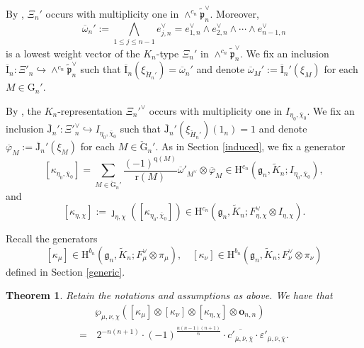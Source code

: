 \documentclass[12pt, a4paper]{amsart}
\newcommand{\RG}{{\mathrm {G}}}
\newcommand{\RH}{{\mathrm {H}}}
\newcommand{\RI}{{\mathrm {I}}}
\newcommand{\RJ}{{\mathrm {J}}}
\theoremstyle{Theorem}
\theoremstyle{Theorem}
\theoremstyle{Theorem}
\theoremstyle{Theorem}
\newtheorem{thmp}[prp]{Theorem}
\theoremstyle{Plain}
\theoremstyle{Definition}
\begin{document}
	
	
	By \cite[Lemma 4.3]{DX}, $\Xi_n'$ occurs with multiplicity one in $\wedge^{c_n}\widetilde{\mathfrak{p}}_n^{\vee}$. Moreover,
	\[
	\overline{\omega}_n':=\bigwedge_{1\leq j\leq n-1}e_{j,n}^{\vee}=e_{1,n}^{\vee}\wedge e_{2,n}^{\vee}\wedge\cdots\wedge e_{n-1,n}^{\vee}
	\]
	is a lowest weight vector of the $K_n$-type $\Xi_n'$ in $\wedge^{c_n}\widetilde{\mathfrak{p}}_n^{\vee}$. We fix an inclusion $\overline{\RI}_n:\Xi'_n\hookrightarrow\wedge^{c_n}\widetilde{\mathfrak{p}}_n^{\vee}$ such that $\overline{\RI}_n(\xi_{\check{H}_n'})=\overline{\omega}_n'$ and denote $\overline{\omega}_M':=\overline{\RI}_n'(\xi_M)$ for each $M\in\RG_n'$.
	
	By \cite[Lemma 4.1]{DX}, the $K_n$-representation $\Xi_n'^{\vee}$ occurs with multiplicity one in $I_{\eta_0,\overline{\chi}_0}$. We fix an inclusion $\overline{\RJ}_n':\Xi'^{\vee}_n\hookrightarrow I_{\eta_0,\overline{\chi}_0}$ such that $\overline{\RJ}_n'(\xi_{\check{H}_n'})(1_n)=1$ and denote $\overline{\varphi}_M:=\overline{\RJ}_n'(\xi_M)$ for each $M\in\check{\RG}_n'$. As in Section \ref{induced}, we fix a generator
	\[
	[\kappa_{\eta_0,\overline{\chi}_0}]=\sum_{M\in\check{\RG}_n'}\frac{(-1)^{\mathrm{q}(M)}}{\mathrm{r}(M)}\overline{\omega}'_{M^{\vee}}\otimes\overline{\varphi}_M\in\RH^{c_n}\left(\mathfrak{g}_n,\widetilde{K}_n;I_{\eta_0,\overline{\chi}_0}\right),
	\]
	and
	\[
	[\kappa_{\eta,\chi}]:=\jmath_{\eta,\chi}([\kappa_{\eta_0,\overline{\chi}_0}])\in\RH^{c_n}\left(\mathfrak{g}_n,\widetilde{K}_n;F_{\eta,\chi}^{\vee}\otimes I_{\eta,\chi}\right).
	\]
	
	Recall the generators 
	\[
	[\kappa_{\mu}]\in\RH^{b_{n}}\left(\mathfrak{g}_{n},\widetilde{K}_{n};F_{\mu}^{\vee}\otimes\pi_{\mu}\right),\quad
	[\kappa_{\nu}]\in\RH^{b_{n}}\left(\mathfrak{g}_{n},\widetilde{K}_{n};F_{\nu}^{\vee}\otimes\pi_{\nu}\right)
	\]
	defined in Section \ref{generic}.
	
	
	
	
	\begin{thmp}
		Retain the notations and assumptions as above. We have that
		\[
		\begin{aligned}
			&\wp_{\mu,\nu,\chi}\left([\kappa_{\mu}]\otimes[\kappa_{\nu}]\otimes[\kappa_{\eta,\chi}]\otimes\mathbf{o}_{n,n}\right)\\
			=&\,2^{-n(n+1)}\cdot (-1)^{\frac{n(n-1)(n+1)}{6}}\cdot  \overline{c'_{\overline{\mu},\overline{\nu},\overline{\chi}}}\cdot\varepsilon'_{\overline{\mu},\overline{\nu},\overline{\chi}}.
		\end{aligned}
		\]
	\end{thmp}
	
\end{document}
